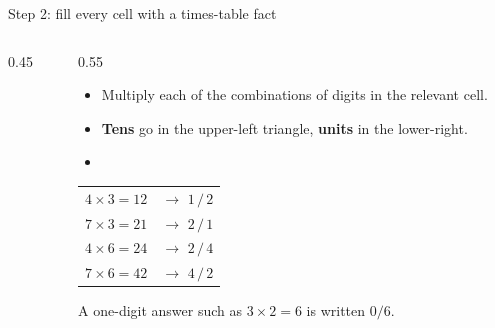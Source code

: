 \documentclass[10pt,aspectratio=169]{beamer}
\newcommand{\lgrid}[2]{%
  \foreach \c in {1,...,#1}{%
    \foreach \r in {1,...,#2}{%
      \draw[cellline] ({\c-1},{-\r+1}) rectangle ({\c},{-\r});
      \draw[diagline] ({\c},{-\r+1}) -- ({\c-1},{-\r});}}%
}
\newcommand{\ltop}[2]{\node[headfont] at ({#1-0.5},{0.32}) {#2};}
\newcommand{\lside}[3]{\node[headfont] at ({#1+0.35},{-#2+0.5}) {#3};}
\newcommand{\lcell}[4]{%
  \node at ({#1-0.72},{-#2+0.70}) {\small #3};
  \node at ({#1-0.28},{-#2+0.30}) {\small #4};}
\begin{document}
\begin{frame}{Step 2: fill every cell with a times-table fact}
  \begin{columns}[c]
    \begin{column}{0.45\textwidth}
      \centering
    \end{column}
    \begin{column}{0.55\textwidth}
      \begin{itemize}
        \item Multiply each of the combinations of digits in the relevant cell.
        \item \textbf{Tens} go in the upper-left triangle, \textbf{units} in the
              lower-right.
        \item[]
      \end{itemize}
      \begin{center}
        \small
        \begin{tabular}{ll}
          $4\times3=12$ & $\rightarrow$ \;$\boxed{1}\,/\,\boxed{2}$\\
          $7\times3=21$ & $\rightarrow$ \;$\boxed{2}\,/\,\boxed{1}$\\
          $4\times6=24$ & $\rightarrow$ \;$\boxed{2}\,/\,\boxed{4}$\\
          $7\times6=42$ & $\rightarrow$ \;$\boxed{4}\,/\,\boxed{2}$
        \end{tabular}
      \end{center}
      \vspace{4pt}
      {\color{mmgrey}\small A one-digit answer such as $3\times2=6$ is written $0/6$.}
    \end{column}
  \end{columns}
\end{frame}
\end{document}

